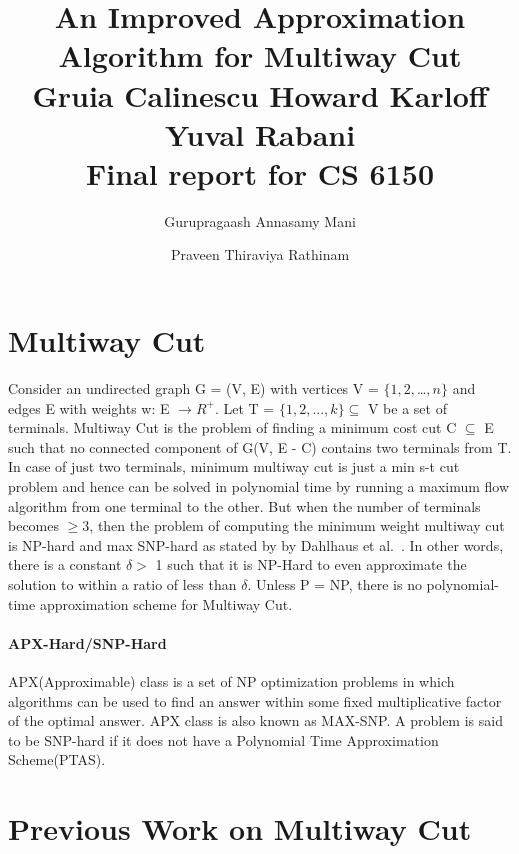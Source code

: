 \documentclass[11pt]{article}
\title{An Improved Approximation Algorithm for Multiway Cut\\Gruia Calinescu Howard Karloﬀ Yuval Rabani\\Final report for CS 6150}
\author{Gurupragaash Annasamy Mani \and Praveen Thiraviya Rathinam}
\begin{document}
\maketitle

\section{Multiway Cut}
Consider an undirected graph G = (V, E) with vertices V = $\{1, 2, $\dots$, n\}$ and edges E with weights w: E $\rightarrow R^{+}$. Let T = $\{1, 2, . . . , k\} \subseteq$ V be a set of terminals. Multiway Cut is the problem of finding a minimum cost cut C $\subseteq$ E such that no connected component of G(V, E - C) contains two terminals from T. In case of just two terminals, minimum multiway cut is just a min s-t cut problem and hence can be solved in polynomial time by running a maximum flow algorithm from one terminal to the other. But when the number of terminals becomes $\ge 3$, then the problem of computing the minimum weight multiway cut is NP-hard and max SNP-hard as stated by by Dahlhaus et al.~\cite{Dahlhaus}. In other words, there is a constant $\delta >$ 1 such that it is NP-Hard to even approximate the solution to within a ratio of less than $\delta$. Unless P = NP, there is no polynomial-time approximation scheme for Multiway Cut.
\paragraph{APX-Hard/SNP-Hard}
APX(Approximable) class is a set of NP optimization problems in which algorithms can be used to find an answer within some fixed multiplicative factor of the optimal answer. APX class is also known as MAX-SNP. A problem is said to be SNP-hard if it does not have a Polynomial Time Approximation Scheme(PTAS).
 
\section{Previous Work on Multiway Cut} 
\end{document}
